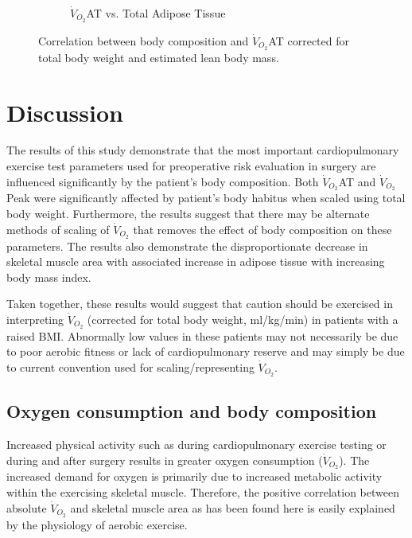 \begin{figure}[htb]
\begin{subfigure}[b]{0.45\textwidth}
		\caption{$\dot{V}_{O_2}$AT vs. 
Total Adipose Tissue}
		\label{fig:bc_scatter_VO2_TAT_elbm}
	\end{subfigure}
	\caption{Correlation between body composition and $\dot{V}_{O_2}$AT corrected for total body weight and estimated lean body mass.}
	\label{fig:bc_scatter_VO2_bodycomp_elbm}
\end{figure}



\clearpage

\section{Discussion}

The results of this study demonstrate that the most important cardiopulmonary exercise test parameters used for preoperative risk evaluation in surgery are influenced significantly by the patient's body composition. 
Both $\dot{V}_{O_2}$AT and $\dot{V}_{O_2}$Peak were significantly affected by patient's body habitus when scaled using total body weight. 
Furthermore, the results suggest that there may be alternate methods of scaling of $\dot{V}_{O_2}$ that removes the effect of body composition on these parameters. 
The results also demonstrate the disproportionate decrease in skeletal muscle area with associated increase in adipose tissue with increasing body mass index. 

Taken together, these results would suggest that caution should be exercised in interpreting $\dot{V}_{O_2}$ (corrected for total body weight, ml/kg/min) in patients with a raised BMI.
Abnormally low values in these patients may not necessarily be due to poor aerobic fitness or lack of cardiopulmonary reserve and may simply be due to current convention used for scaling/representing $\dot{V}_{O_2}$.

\subsection{Oxygen consumption and body composition}

Increased physical activity such as during cardiopulmonary exercise testing or during and after surgery results in greater oxygen consumption ($\dot{V}_{O_2}$). 
The increased demand for oxygen is primarily due to increased metabolic activity within the exercising skeletal muscle.
Therefore, the positive correlation between absolute $\dot{V}_{O_2}$ and skeletal muscle area as has been found here is easily explained by the physiology of aerobic exercise. 

